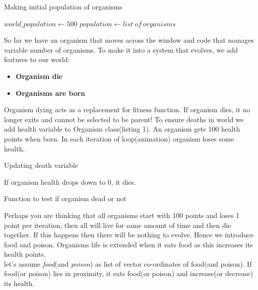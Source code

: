 \documentclass[conference]{IEEEtran}
\begin{document}
\begin{algorithm}
\caption{Making initial population of organisms}
\begin{algorithmic} 
\STATE $world\_population\gets 500$
\STATE $population\gets list\ of\ organisms$
\ENDFOR
\end{algorithmic}
\end{algorithm}

So far we have an organism that moves across the window and code that manages variable number of organisms. To make it into a system that evolves, we add features to our world:
\begin{itemize}
\item \textbf{Organism die}
\item \textbf{Organisms are born}
\end{itemize}
Organism dying acts as a replacement for fitness function. If organism dies, it no longer exits and cannot be selected to be parent! To ensure deaths in world we add health variable to Organism class(listing 1). An organism gets 100 health points when born. In each iteration of loop(animation) organism loses some health.

\begin{algorithm}
\caption{Updating death variable}
\begin{algorithmic} 
\end{algorithmic}
\end{algorithm}

If organism health drops down to 0, it dies.

\begin{algorithm}
\caption{Function to test if organism dead or not}
\begin{algorithmic} 
\ELSE
{}
\ENDIF
\end{algorithmic}
\end{algorithm}

Perhaps you are thinking that all organisms start with 100 points and loses 1 point per iteration, then all will live for same amount of time and then die together. If this happens then there will be nothing to evolve. Hence we introduce food and poison. Organisms life is extended when it eats food as this increases its health points.\\
let's assume \textit{food}(and \textit{poison}) as list of vector co-ordinates of food(and poison). If food(or poison) lies in proximity, it eats food(or poison) and increase(or decrease) its health.
\end{document}
